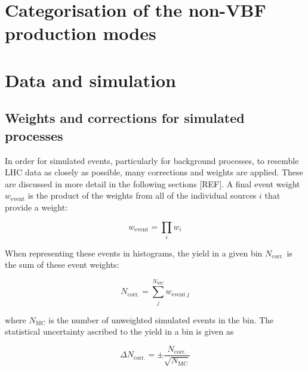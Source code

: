 

\section{Categorisation of the non-VBF production modes}
\label{sec:htoinv_categorisation}




\section{Data and simulation}
\label{sec:htoinv_data_sim}




\subsection{Weights and corrections for simulated processes}
\label{subsec:htoinv_mc_corrections}

In order for simulated events, particularly for background processes, to resemble LHC data as closely as possible, many corrections and weights are applied. These are discussed in more detail in the following sections [REF]. A final event weight $w_{\mathrm{event}}$ is the product of the weights from all of the individual sources $i$ that provide a weight:

\begin{equation}
\label{eq:event_weight}
w_{\mathrm{event}} = \prod_i w_i
\end{equation}

When representing these events in histograms, the yield in a given bin $N_{\mathrm{corr.}}$ is the sum of these event weights:

\begin{equation}
\label{eq:bin_weight}
N_{\mathrm{corr.}} = \sum_j^{N_{\mathrm{MC}}} w_{\mathrm{event} \ j}
\end{equation}

where $N_{\mathrm{MC}}$ is the number of unweighted simulated events in the bin. The statistical uncertainty ascribed to the yield in a bin is given as

\begin{equation}
\Delta N_{\mathrm{corr.}} = \pm \frac{ N_{\mathrm{corr.}} }{ \sqrt{N_{\mathrm{MC}}} }
\label{eq:uncertainty_mc_ours}
\end{equation}

